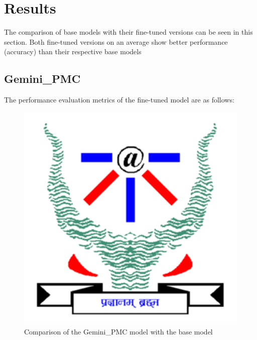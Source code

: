 \chapter{Results}
\label{C4} %
\clearpage
The comparison of base models with their fine-tuned versions can be seen in this section. Both fine-tuned versions on an average show better performance (accuracy) than their respective base models


\section{Gemini\_PMC}
The performance evaluation metrics of the fine-tuned model are as follows:
\begin{figure}[H]
    \centering
\includegraphics[width=1.0\textwidth]{IMAGE/IIITAlogo.png}
\caption{Comparison of the Gemini\_PMC model with the base model}
\end{figure}

